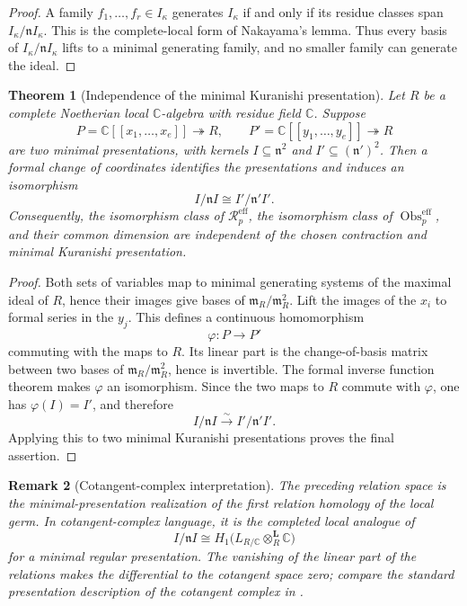 \documentclass[11pt]{amsart}
\newtheorem{theorem}{Theorem}[section]
\newtheorem{remark}[theorem]{Remark}
\newcommand{\Obs}{\operatorname{Obs}}
\newcommand{\C}{\mathbb C}
\begin{document}
\begin{proof}
A family $f_1,\ldots,f_r\in I_\kappa$ generates $I_\kappa$ if and only if its residue classes span $I_\kappa/\mathfrak n I_\kappa$.  This is the complete-local form of Nakayama's lemma.  Thus every basis of $I_\kappa/\mathfrak n I_\kappa$ lifts to a minimal generating family, and no smaller family can generate the ideal.
\end{proof}

\begin{theorem}[Independence of the minimal Kuranishi presentation]\label{thm:effective-intrinsic}
Let $R$ be a complete Noetherian local $\C$-algebra with residue field $\C$.  Suppose
\[
P=\C[[x_1,\ldots,x_e]]\twoheadrightarrow R,
\qquad
P'=\C[[y_1,\ldots,y_e]]\twoheadrightarrow R
\]
are two minimal presentations, with kernels $I\subseteq\mathfrak n^2$ and $I'\subseteq(\mathfrak n')^2$.  Then a formal change of coordinates identifies the presentations and induces an isomorphism
\[
I/\mathfrak n I
\cong
I'/\mathfrak n'I'.
\]
Consequently, the isomorphism class of $\mathscr R^{\mathrm{eff}}_p$, the isomorphism class of $\Obs^{\mathrm{eff}}_p$, and their common dimension are independent of the chosen contraction and minimal Kuranishi presentation.
\end{theorem}

\begin{proof}
Both sets of variables map to minimal generating systems of the maximal ideal of $R$, hence their images give bases of $\mathfrak m_R/\mathfrak m_R^2$.  Lift the images of the $x_i$ to formal series in the $y_j$.  This defines a continuous homomorphism
\[
\varphi:P\longrightarrow P'
\]
commuting with the maps to $R$.  Its linear part is the change-of-basis matrix between two bases of $\mathfrak m_R/\mathfrak m_R^2$, hence is invertible.  The formal inverse function theorem makes $\varphi$ an isomorphism.  Since the two maps to $R$ commute with $\varphi$, one has $\varphi(I)=I'$, and therefore
\[
I/\mathfrak n I\xrightarrow{\sim}I'/\mathfrak n'I'.
\]
Applying this to two minimal Kuranishi presentations proves the final assertion.
\end{proof}

\begin{remark}[Cotangent-complex interpretation]
The preceding relation space is the minimal-presentation realization of the first relation homology of the local germ.  In cotangent-complex language, it is the completed local analogue of
\[
I/\mathfrak n I
\cong
H_1\bigl(L_{R/\C}\otimes_R^{\mathbf L}\C\bigr)
\]
for a minimal regular presentation.  The vanishing of the linear part of the relations makes the differential to the cotangent space zero; compare the standard presentation description of the cotangent complex in \cite{StacksCotangent}.
\end{remark}
\end{document}
